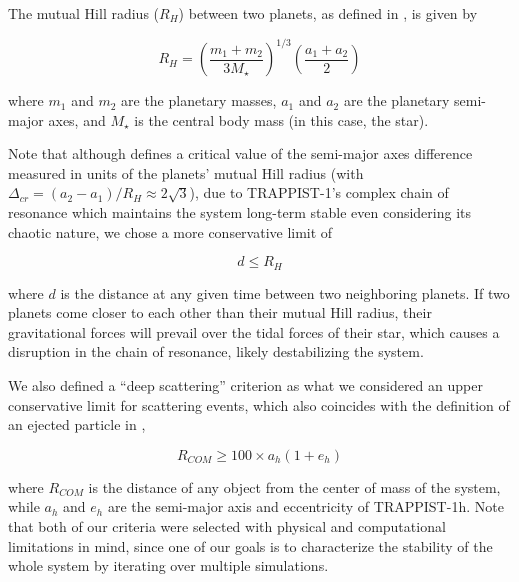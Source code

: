 \documentclass{aa}
\begin{document}
The mutual Hill radius ($R_H$) between two planets, as defined in \citet{1996Icar..119..261C}, is given by

\begin{equation}
    R_H = \left(\frac{m_1+m_2}{3M_\star}\right)^{1/3}\left(\frac{a_1+a_2}{2}\right)
    \label{eq:hill_radius}
\end{equation}

where $m_1$ and $m_2$ are the planetary masses, $a_1$ and $a_2$ are the planetary semi-major axes, and $M_\star$ is the central body mass (in this case, the star). 

Note that although \citet{1996Icar..119..261C} defines a critical value of the semi-major axes difference measured in units of the planets' mutual Hill radius (with $\Delta_{cr}=(a_2-a_1)/R_H\approx 2\sqrt{3}$), due to TRAPPIST-1's complex chain of resonance which maintains the system long-term stable \citep{2017NatAs...1E.129L} even considering its chaotic nature, we chose a more conservative limit of

\begin{equation}
    d \leq R_H
\end{equation}

where $d$ is the distance at any given time between two neighboring planets. If two planets come closer to each other than their mutual Hill radius, their gravitational forces will prevail over the tidal forces of their star, which causes a disruption in the chain of resonance, likely destabilizing the system.

We also defined a ``deep scattering'' criterion as what we considered an upper conservative limit for scattering events, which also coincides with the definition of an ejected particle in \citet{2018MNRAS.479.2649K},

\begin{equation}
    R_{COM} \geq 100 \times a_h(1+e_h)
\end{equation}

where $R_{COM}$ is the distance of any object from the center of mass of the system, while $a_h$ and $e_h$ are the semi-major axis and eccentricity of TRAPPIST-1h. Note that both of our criteria were selected with physical and computational limitations in mind, since one of our goals is to characterize the stability of the whole system by iterating over multiple simulations.
\end{document}
